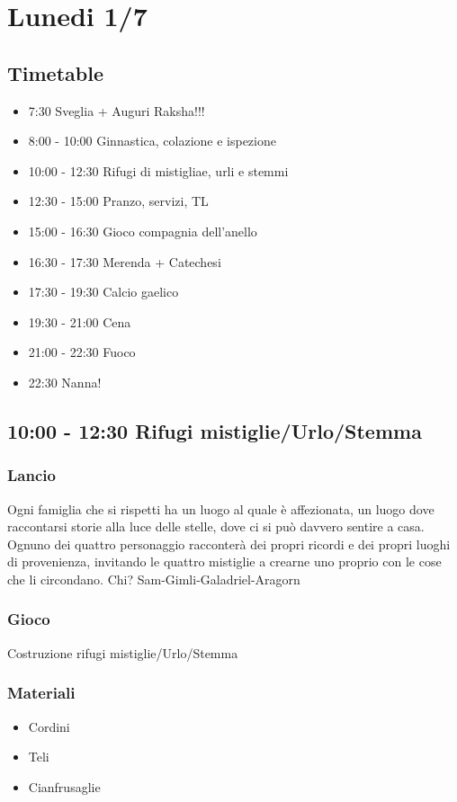 \documentclass[../main.tex]{subfiles}
\begin{document}
   \section{Lunedi 1/7}
   \subsection{Timetable}
   \begin{itemize}
        \item 7:30 Sveglia + Auguri Raksha!!!
        \item 8:00 - 10:00 Ginnastica, colazione e ispezione
        \item 10:00 - 12:30 Rifugi di mistigliae, urli e stemmi
        \item 12:30 - 15:00 Pranzo, servizi, TL
        \item 15:00 - 16:30 Gioco compagnia dell'anello
        \item 16:30 - 17:30 Merenda + Catechesi
        \item 17:30 - 19:30 Calcio gaelico
        \item 19:30 - 21:00 Cena
        \item 21:00 - 22:30 Fuoco
        \item 22:30 Nanna!
    \end{itemize}

   \subsection{10:00 - 12:30 Rifugi mistiglie/Urlo/Stemma}
       \subsubsection{Lancio}
       Ogni famiglia che si rispetti ha un luogo al quale è affezionata, un luogo dove raccontarsi storie alla
luce delle stelle, dove ci si può davvero sentire a casa.
Ognuno dei quattro personaggio racconterà dei propri ricordi e dei propri luoghi di provenienza,
invitando le quattro mistiglie a crearne uno proprio con le cose che li circondano.
Chi? Sam-Gimli-Galadriel-Aragorn

        \subsubsection{Gioco}
        Costruzione rifugi mistiglie/Urlo/Stemma
        \subsubsection{Materiali}
        \begin{itemize}
            \item Cordini
            \item Teli
            \item Cianfrusaglie
        \end{itemize}
\end{document}
